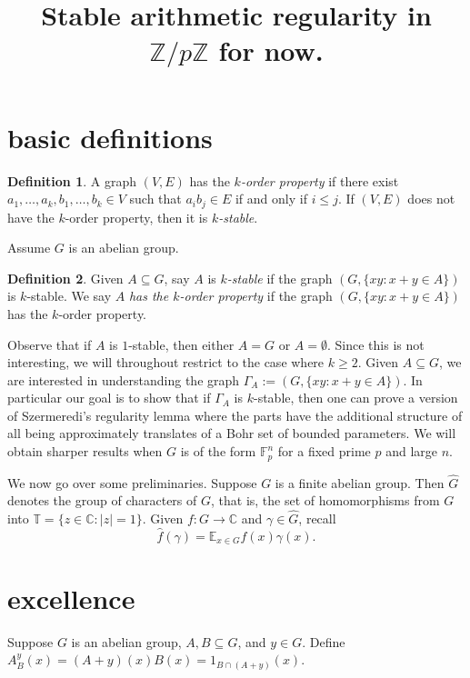 \documentclass[11pt]{article}
\title{
Stable arithmetic regularity in $\mathbb{Z}/p\mathbb{Z}$ for now.
}
\author{
}
\date{}
\theoremstyle{definition}
\newtheorem{definition}{Definition}
\begin{document}
\maketitle


\section{basic definitions}


\begin{definition}
A graph $(V,E)$ has the \emph{$k$-order property} if there exist $a_1,\ldots, a_k,b_1,\ldots, b_k\in V$ such that $a_ib_j\in E$ if and only if $i\leq j$. If $(V,E)$ does not have the $k$-order property, then it is \emph{$k$-stable}.
\end{definition}

Assume $G$ is an abelian group.  
\begin{definition}
Given $A\subseteq G$, say $A$ is \emph{$k$-stable} if the graph $(G,\{xy: x+y\in A\})$ is $k$-stable.  We say $A$ \emph{has the $k$-order property} if the graph $(G,\{xy: x+y\in A\})$ has the $k$-order property.
\end{definition}

Observe that if $A$ is $1$-stable, then either $A=G$ or $A=\emptyset$.  Since this is not interesting, we will throughout restrict to the case where $k\geq 2$. Given $A\subseteq G$, we are interested in understanding the graph $\Gamma_A:=(G,\{xy: x+y\in A\})$.  In particular our goal is to show that if $\Gamma_A$ is $k$-stable, then one can prove a version of Szermeredi's regularity lemma where the parts have the additional structure of all being approximately translates of a Bohr set of bounded parameters.  We will obtain sharper results when $G$ is of the form $\mathbb{F}_p^n$ for a fixed prime $p$ and large $n$.  

We now go over some preliminaries. Suppose $G$ is a finite abelian group.  Then $\widehat{G}$ denotes the group of characters of $G$, that is, the set of homomorphisms from $G$ into $\mathbb{T}=\{z\in \mathbb{C}: |z|=1\}$.  Given $f:G\rightarrow \mathbb{C}$ and $\gamma\in \widehat{G}$, recall 
$$
\widehat{f}(\gamma)=\mathbb{E}_{x\in G} f(x)\gamma(x).
$$



\section{excellence}
Suppose $G$ is an abelian group, $A, B\subseteq G$, and $y\in G$.  Define $A^{y}_B(x)=(A+y)(x)B(x)=1_{B\cap (A+y)}(x)$. 
\end{document}
